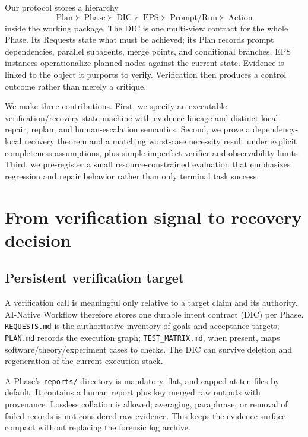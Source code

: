 \documentclass{article}
\begin{document}
Our protocol stores a hierarchy
\[
\text{Plan}\succ\text{Phase}\succ\text{DIC}\succ\text{EPS}\succ\text{Prompt/Run}\succ\text{Action}
\]
inside the working package. The DIC is one multi-view contract for the whole Phase. Its Requests state what must be achieved; its Plan records prompt dependencies, parallel subagents, merge points, and conditional branches. EPS instances operationalize planned nodes against the current state. Evidence is linked to the object it purports to verify. Verification then produces a control outcome rather than merely a critique.

We make three contributions. First, we specify an executable verification/recovery state machine with evidence lineage and distinct local-repair, replan, and human-escalation semantics. Second, we prove a dependency-local recovery theorem and a matching worst-case necessity result under explicit completeness assumptions, plus simple imperfect-verifier and observability limits. Third, we pre-register a small resource-constrained evaluation that emphasizes regression and repair behavior rather than only terminal task success.

\section{From verification signal to recovery decision}
\subsection{Persistent verification target}
A verification call is meaningful only relative to a target claim and its authority. AI-Native Workflow therefore stores one durable intent contract (DIC) per Phase. \texttt{REQUESTS.md} is the authoritative inventory of goals and acceptance targets; \texttt{PLAN.md} records the execution graph; \texttt{TEST\_MATRIX.md}, when present, maps software/theory/experiment cases to checks. The DIC can survive deletion and regeneration of the current execution stack.

A Phase's \texttt{reports/} directory is mandatory, flat, and capped at ten files by default. It contains a human report plus key merged raw outputs with provenance. Lossless collation is allowed; averaging, paraphrase, or removal of failed records is not considered raw evidence. This keeps the evidence surface compact without replacing the forensic log archive.
\end{document}
